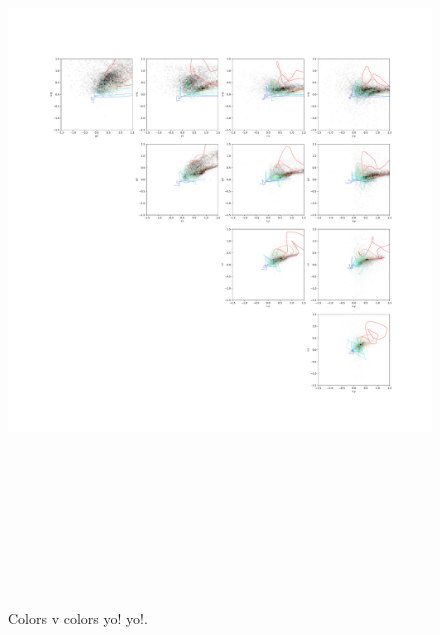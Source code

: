 \begin{figure}
    \centering
    \includegraphics[height=8in]{figures/color_v_color.pdf}
    \caption{Colors v colors yo! yo!.}
    \label{fig:dp_color_v_color}
\end{figure}

